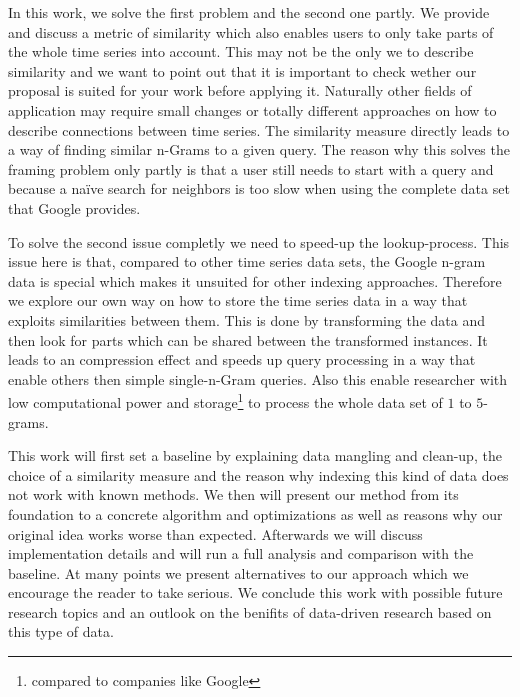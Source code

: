 In this work, we solve the first problem and the second one partly. We provide and discuss a metric of similarity which also enables users to only take parts of the whole time series into account. This may not be the only we to describe similarity and we want to point out that it is important to check wether our proposal is suited for your work before applying it. Naturally other fields of application may require small changes or totally different approaches on how to describe connections between time series. The similarity measure directly leads to a way of finding similar n-Grams to a given query. The reason why this solves the framing problem only partly is that a user still needs to start with a query and because a na{\"i}ve search for neighbors is too slow when using the complete data set that Google provides.

To solve the second issue completly we need to speed-up the lookup-process. This issue here is that, compared to other time series data sets, the Google n-gram data is special which makes it unsuited for other indexing approaches. Therefore we explore our own way on how to store the time series data in a way that exploits similarities between them. This is done by transforming the data and then look for parts which can be shared between the transformed instances. It leads to an compression effect and speeds up query processing in a way that enable others then simple single-n-Gram queries. Also this enable researcher with low computational power and storage\footnote{compared to companies like Google} to process the whole data set of $1$ to $5$-grams.

This work will first set a baseline by explaining data mangling and clean-up, the choice of a similarity measure and the reason why indexing this kind of data does not work with known methods. We then will present our method from its foundation to a concrete algorithm and optimizations as well as reasons why our original idea works worse than expected. Afterwards we will discuss implementation details and will run a full analysis and comparison with the baseline. At many points we present alternatives to our approach which we encourage the reader to take serious. We conclude this work with possible future research topics and an outlook on the benifits of data-driven research based on this type of data.
